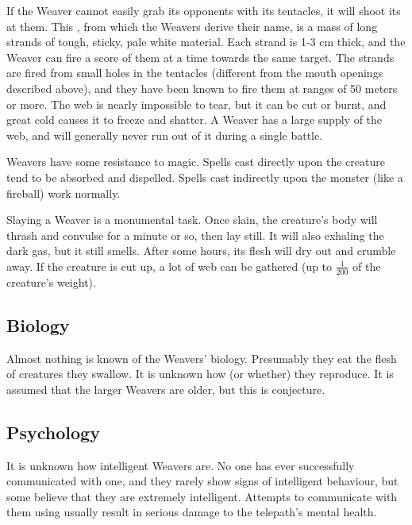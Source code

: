 If the Weaver cannot easily grab its opponents with its tentacles, it will shoot its  at them. This , from which the Weavers derive their name, is a mass of long strands of tough, sticky, pale white material. Each strand is 1-3 cm thick, and the Weaver can fire a score of them at a time towards the same target. The strands are fired from small holes in the tentacles (different from the mouth openings described above), and they have been known to fire them at ranges of 50 meters or more. The web is nearly impossible to tear, but it can be cut or burnt, and great cold causes it to freeze and shatter. A Weaver has a large supply of the web, and will generally never run out of it during a single battle. 

Weavers have some resistance to magic. Spells cast directly upon the creature tend to be absorbed and dispelled. Spells cast indirectly upon the monster (like a fireball) work normally. 

Slaying a Weaver is a monumental task. Once slain, the creature's body will thrash and convulse for a minute or so, then lay still. It will also exhaling the dark gas, but it still smells. After some hours, its flesh will dry out and crumble away. If the creature is cut up, a lot of web can be gathered (up to $\frac{1}{200}$ of the creature's weight). 









\subsection{Biology}
Almost nothing is known of the Weavers' biology. Presumably they eat the flesh of creatures they swallow. It is unknown how (or whether) they reproduce. It is assumed that the larger Weavers are older, but this is conjecture. 









\subsection{Psychology}
It is unknown how intelligent Weavers are. No one has ever successfully communicated with one, and they rarely show signs of intelligent behaviour, but some believe that they are extremely intelligent. Attempts to communicate with them using  usually result in serious damage to the telepath's mental health. 

